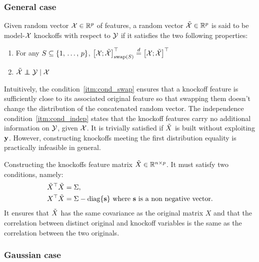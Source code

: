 \subsubsection{General case}

\begin{definition}
    Given random vector $\mathcal{X} \in \mathbb{R}^p$ of features,
    a random vector $\tilde{\mathcal{X}} \in \mathbb{R}^p$ is said to be model-$\mathcal{X}$ knockoffs with respect to $\mathcal{Y}$
    if it satisfies the two following properties:
    \begin{enumerate}[label=\textbf{S.\arabic*},ref=S.\arabic*]
        \item \label{itm:cond_swap} For any $S \subseteq \left\{ 1,\, \dots,\, p \right\}$,
            $\big[ \mathcal{X}; \tilde{\mathcal{X}} \big]^\top_{\operatorname{swap}(S)} \stackrel{d}{=} \big[ \mathcal{X}; \tilde{\mathcal{X}} \big]^\top$
        \item \label{itm:cond_indep} $\tcX \independent \cY \mid \cX$
    \end{enumerate}
\end{definition}
Intuitively, the condition~\ref{itm:cond_swap} ensures that a knockoff feature is sufficiently
close to its associated original feature so that swapping them doesn't change the distribution of the
concatenated random vector.
The independence condition~\ref{itm:cond_indep} states that the knockoff features
carry no additional information on $\mathcal{Y}$, given $\mathcal{X}$.
It is trivially satisfied if $\tilde{X}$ is built without exploiting $\mathbf{y}$.
However, constructing knockoffs meeting the first distribution equality is practically infeasible in general.
\begin{remark}
    Constructing the knockoffs feature matrix $\tilde{X} \in \mathbb{R}^{n \times p}$.
    It must satisfy two conditions, namely:
    \begin{align*}
        &{\tilde{X}}^\top\tilde{X} = \Sigma,
        \\
        &X^\top\tilde{X} = \Sigma - \operatorname*{diag}\{\mathbf{s}\}
        \text{ where } \mathbf{s} \text{ is a non negative vector.}
    \end{align*}
    It ensures that $\tilde{X}$ has the same covariance as the original matrix $X$
    and that the correlation between distinct original and knockoff variables is
    the same as the correlation between the two originals.
\end{remark}

\subsubsection{Gaussian case}

